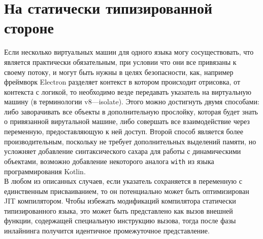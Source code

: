 \documentclass[times,specification,annotation]{itmo-student-thesis}
\begin{document}
\section{На статически типизированной стороне}
Если несколько виртуальных машин для одного языка могу сосуществовать, что является практически обязательным, при условии что они все привязаны к своему потоку, и могут быть нужны в целях безопасности, как, например фреймворк Electron разделяет контекст в котором происходит отрисовка, от контекста с логикой, то необходимо везде передавать указатель на виртуальную машину (в терминологии v8---isolate). Этого можно достигнуть двумя способами: либо заворачивать все объекты в дополнительную прослойку, которая будет знать о привязанной вирутальной машине, либо совершать все взаимодействие через переменную, предоставляющую к ней доступ. Второй способ является более производительным, поскольку не требует дополнительных выделений памяти, но усложняет добавление синтаксического сахара для работы с динамическими объектами, возможно добавление некоторого аналога \texttt{with} из языка программирования Kotlin.\\
В любом из описанных случаев, если указатель сохраняется в переменную с единственным присваиванием, то он потенциально может быть оптимизирован JIT компилятором. Чтобы избежать модификаций компилятора статически типизированного языка, это может быть представлено как вызов внешней функции, содержащей специальную инструкцию вызова, тогда после фазы инлайнинга получится идентичное промежуточное представление.
\end{document}
